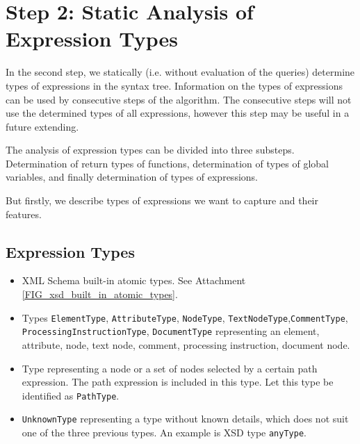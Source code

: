 
\section{Step 2: Static Analysis of Expression Types}
In the second step, we statically (i.e. without evaluation of the queries) determine types of expressions in the syntax tree. Information on the types of expressions can be used by consecutive steps of the algorithm. The consecutive steps will not use the determined types of all expressions, however this step may be useful in a future extending.


The analysis of expression types can be divided into three substeps. Determination of return types of functions, determination of types of global variables, and finally determination of types of expressions.

But firstly, we describe types of expressions we want to capture and their features.

\subsection{Expression Types}
\begin{itemize}
\item XML Schema built-in atomic types. See Attachment \ref{FIG_xsd_built_in_atomic_types}.
\item Types \texttt{ElementType}, \texttt{AttributeType}, \texttt{NodeType}, \texttt{TextNodeType},\linebreak \texttt{CommentType}, \texttt{ProcessingInstructionType}, \texttt{DocumentType} representing an element, attribute, node, text node, comment, processing instruction, document node.
\item Type representing a node or a set of nodes selected by a certain path expression. The path expression is included in this type. Let this type be identified as \texttt{PathType}.
\item \texttt{UnknownType} representing a type without known details, which does not suit one of the three previous types. An example is XSD type \texttt{anyType}.
\end{itemize}

